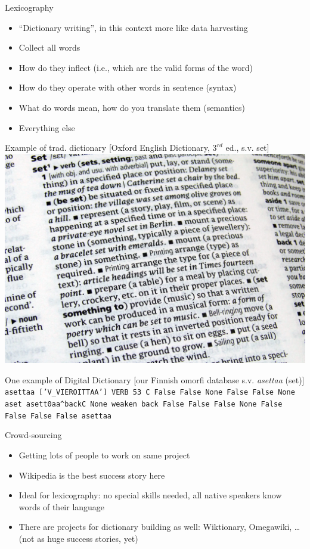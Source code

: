 \documentclass[t,12pt]{beamer}
\begin{document}
\begin{frame}{Lexicography}
    \begin{itemize}
        \item ``Dictionary writing'', in this context more like data harvesting
        \item Collect all words
        \item How do they inflect (i.e., which are the valid forms of the word)
        \item How do they operate with other words in sentence (syntax)
        \item What do words mean, how do you translate them (semantics)
        \item Everything else
    \end{itemize}
\end{frame}

\begin{frame}[plain]{Example of trad. dictionary}
    [Oxford English Dictionary, $3^{rd}$ ed., s.v. set]
    \includegraphics[keepaspectratio=true,width=1\paperwidth]{oed}
\end{frame}

\begin{frame}{One example of Digital Dictionary}
    [our Finnish omorfi database s.v. \emph{asettaa} (set)]
\texttt{
asettaa	['V\_VIEROITTAA']	VERB	53	C	False	False	None	False	False	None	aset	aset{t0}aa{\textasciicircum back}{C}	None	weaken	back	False	False	False	None	False	False	False	False	asettaa
    }
\end{frame}

\begin{frame}{Crowd-sourcing}
    \begin{itemize}
        \item Getting lots of people to work on same project
        \item Wikipedia is the best success story here
        \item Ideal for lexicography: no special skills needed, all native
            speakers know words of their language
        \item There are projects for dictionary building as well:
            Wiktionary, Omegawiki, \ldots (not as huge success stories, yet)
    \end{itemize}
\end{frame}
\end{document}
